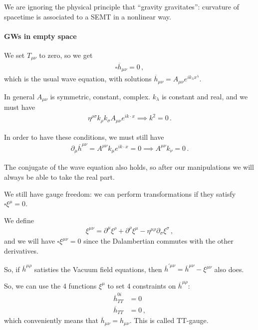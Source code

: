 \documentclass[main.tex]{subfiles}
\begin{document}
We are ignoring the physical principle that ``gravity gravitates'': curvature of spacetime is associated to a SEMT in a nonlinear way. 

\paragraph{GWs in empty space}

We set \(T_{\mu  \nu }\) to zero, so we get 
%
\begin{align}
\square \overline{h}_{\mu \nu } = 0
\,,
\end{align}
%
which is the usual wave equation, with solutions \(\overline{h}_{\mu \nu } = A_{\mu \nu } e^{i k_{\lambda }x^{\lambda }}\). 

In general \(A_{\mu \nu } \) is symmetric, constant, complex. \(k_{\lambda }\) is constant and real, and we must have 
%
\begin{align}
\eta^{\rho \sigma } k_{\rho } k_{\sigma } A_{\mu \nu } e^{i k \cdot x } \implies k^2=0
\,.
\end{align}

In order to have these conditions, we must still have 
%
\begin{align}
\partial_{\mu } \overline{h}^{\mu \nu } 
= A^{\mu \nu } k_{\mu } e^{i k \cdot x } = 0 
\implies A^{\mu \nu }k_{\nu } = 0
\,.
\end{align}

The conjugate of the wave equation also holds, so after our manipulations we will always be able to take the real part. 

We still have gauge freedom: we can perform transformations if they satisfy \(\square \xi^{\mu }=0\).

We define 
%
\begin{align}
\xi^{\mu \nu } = \partial^{ \mu } \xi^{\rho } + \partial^{\rho } \xi^{\mu } - \eta^{\mu \rho } \partial_{\sigma } \xi^{\sigma }
\,,
\end{align}
%
and we will have \(\square \xi^{\mu \nu } =0 \)  since the Dalambertian commutes with the other derivatives.

So, if \(\overline{h}^{\mu \rho }\) satisties the Vacuum field equations, then \(\overline{h}^{\prime \mu \nu } = \overline{h}^{\mu \nu } - \xi^{\mu \nu }\) also does. 

So, we can use the 4 functions \(\xi^{\mu }\) to set 4 constraints on \(\overline{h}^{\mu \rho }\): 
%
\begin{subequations}
\begin{align}
\overline{h}^{0i}_{TT} &= 0  \\
 \overline{h}_{TT} &= 0
\,,
\end{align}
\end{subequations}
%
which conveniently means that \(\overline{h}_{\mu \nu } = h_{\mu \nu }\). This is called TT-gauge. 
\end{document}
